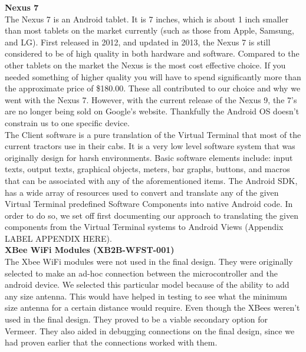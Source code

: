 \documentclass[paper=a4, fontsize=11pt]{scrartcl}
\numberwithin{equation}{section}		%
\numberwithin{figure}{section}			%
\numberwithin{table}{section}				%
\begin{document}
\textbf{Nexus 7} \\
The Nexus 7 is an Android tablet. It is 7 inches, which is about 1 inch smaller than most tablets on the market currently (such as those from Apple, Samsung, and LG). First released in 2012, and updated in 2013, the Nexus 7 is still considered to be of high quality in both hardware and software. Compared to the other tablets on the market the Nexus is the most cost effective choice. If you needed something of higher quality you will have to spend significantly more than the approximate price of \$180.00. These all contributed to our choice and why we went with the Nexus 7. However, with the current release of the Nexus 9, the 7's are no longer being sold on Google's website. Thankfully the Android OS doesn't constrain us to one specific device. \\

The Client software is a pure translation of the Virtual Terminal that most of the current tractors use in their cabs. It is a very low level software system that was originally design for harsh environments. Basic software elements include: input texts, output texts, graphical objects, meters, bar graphs, buttons, and macros that can be associated with any of the aforementioned items. The Android SDK, has a wide array of resources used to convert and translate any of the given Virtual Terminal predefined Software Components into native Android code. In order to do so, we set off first documenting our approach to translating the given components from the Virtual Terminal systems to Android Views (Appendix LABEL APPENDIX HERE).  \\

\textbf{XBee WiFi Modules (XB2B-WFST-001)} \\
The Xbee WiFi modules were not used in the final design. They were originally selected to make an ad-hoc connection between the microcontroller and the android device. We selected this particular model because of the ability to add any size antenna. This would have helped in testing to see what the minimum size antenna for a certain distance would require. Even though the XBees weren't used in the final design. They proved to be a viable secondary option for Vermeer. They also aided in debugging connections on the final design, since we had proven earlier that the connections worked with them. \\

\pagebreak
\end{document}
